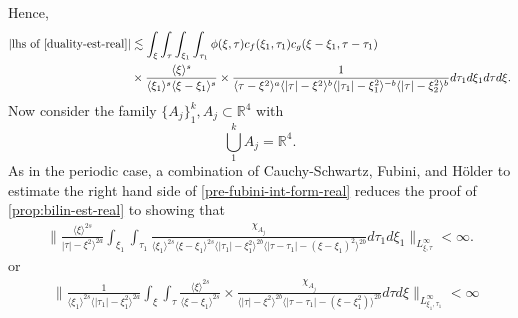 \documentclass[12pt,reqno]{amsart}
\numberwithin{equation}{section}  %
\newcommand{\rr}{\mathbb{R}}
\begin{document}
%
%
Hence, 
%
%
\begin{equation}
  \label{pre-fubini-int-form-real}
	\begin{split}
    |\text{lhs of} \ \eqref{duality-est-real}|
    & \lesssim \int_{\xi} \int_{\tau}   
    \int_{\xi_{1}}  \int_{\tau_{1}} \phi(\xi, \tau)
    c_f(\xi_1, \tau_1)
		c_g(\xi - \xi_1, \tau - \tau_1 )
		\\
    & \times \frac{\langle \xi \rangle ^{s}}{\langle \xi_{1} \rangle ^{s} \langle
    \xi-\xi_{1} \rangle ^{s}} \times \frac{1}{ \langle \tau - \xi^{2} \rangle^{a}
\langle |\tau| - \xi^{2} \rangle
    ^{b}\langle |\tau_{1}|-\xi_{1}^{2} \rangle ^{-b}\langle | \tau|-\xi_{2}^{2}
    \rangle ^{b}} d \tau_1 d \xi_{1} d \tau d \xi.
	\end{split}
\end{equation}
%
%
%
Now consider the family $\{A_{j}\}_{1}^{k}, A_{j} \subset \rr^{4}$ with
$$\bigcup_{1}^{k} A_{j}= \rr^{4}.$$ 
As in the periodic case, a combination of Cauchy-Schwartz, Fubini, and
H{\"o}lder to estimate the right hand side of \eqref{pre-fubini-int-form-real}
reduces the proof of \cref{prop:bilin-est-real} to showing that
%
%
%
%
\begin{equation}
  \label{key-sup-estimate-real}
  \begin{split}
     \|   \frac{\langle \xi
     \rangle ^{2s}}{ | \tau | - \xi^{2} \rangle ^{2a}}\int_{\xi_{1}}
     \int_{\tau_{1}} \frac{\chi_{A_{j}}}{ \langle \xi_{1} \rangle ^{2s} \langle
\xi-\xi_{1} \rangle ^{2s}
\langle | \tau_{1}|-\xi_{1}^{2} \rangle^{2b}  \langle  |\tau -
    \tau_{1} | -(\xi - \xi_{1})^{2}
    \rangle^{2b}  } d \tau_1 d \xi_{1} \|_{L^\infty_{\xi, \tau}} < \infty.
  \end{split}
\end{equation}
%
or
\begin{equation}
\begin{split}
  & \| \frac{1}{\langle \xi_{1} \rangle ^{2s}
  \langle | \tau_{1} | - \xi_{1}^{2} \rangle
  ^{2a}} \int_{\xi} \int_{\tau} \frac{\langle \xi \rangle ^{2s}}{\langle
  \xi - \xi_{1}\rangle ^{2s}}  \times \frac{\chi_{A_{j}}}{\langle | \tau | - \xi^{2} \rangle^{2b}  \langle | \tau -
  \tau_{1} | - (\xi - \xi_{1}^{2}) \rangle^{2b} } d \tau d \xi
  \|_{L^{\infty}_{\xi_{1}, \tau_{1}}} < \infty
\end{split}
\end{equation}
\end{document}
